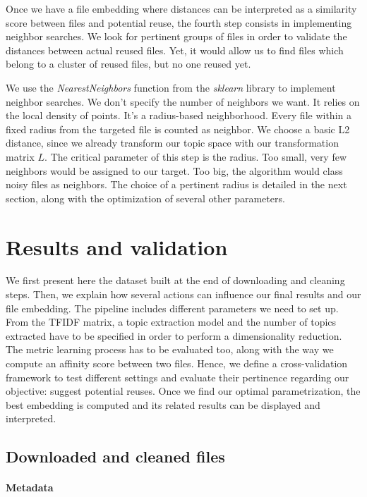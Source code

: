 \documentclass[a4paper]{article}
\begin{document}
	Once we have a file embedding where distances can be interpreted as a similarity score between files and potential reuse, the fourth step consists in implementing neighbor searches. We look for pertinent groups of files in order to validate the distances between actual reused files. Yet, it would allow us to find files which belong to a cluster of reused files, but no one reused yet.
	
	We use the \emph{NearestNeighbors} function from the \emph{sklearn} library to implement neighbor searches. We don't specify the number of neighbors we want. It relies on the local density of points. It's a radius-based neighborhood. Every file within a fixed radius from the targeted file is counted as neighbor. We choose a basic L2 distance, since we already transform our topic space with our transformation matrix $L$. The critical parameter of this step is the radius. Too small, very few neighbors would be assigned to our target. Too big, the algorithm would class noisy files as neighbors. The choice of a pertinent radius is detailed in the next section, along with the optimization of several other parameters.
	
	\section{Results and validation}
	
	We first present here the dataset built at the end of downloading and cleaning steps. Then, we explain how several actions can influence our final results and our file embedding. The pipeline includes different parameters we need to set up. From the \ac{TFIDF} matrix, a topic extraction model and the number of topics extracted have to be specified in order to perform a dimensionality reduction. The metric learning process has to be evaluated too, along with the way we compute an affinity score between two files. Hence, we define a cross-validation framework to test different settings and evaluate their pertinence regarding our objective: suggest potential reuses. Once we find our optimal parametrization, the best embedding is computed and its related results can be displayed and interpreted.
	
	\subsection{Downloaded and cleaned files}

	\paragraph{Metadata}
	
\end{document}
